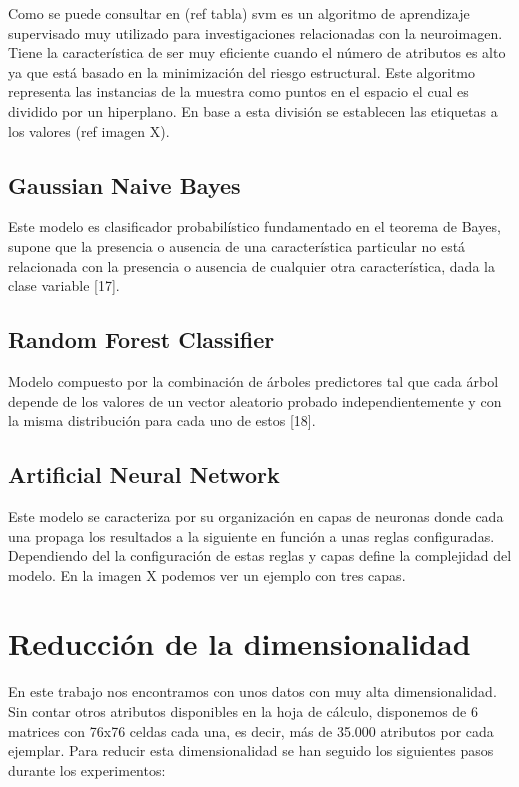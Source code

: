 Como se puede consultar en (ref tabla) \gls{svm} es un algoritmo de aprendizaje supervisado muy utilizado para investigaciones relacionadas con la neuroimagen. Tiene la característica de ser muy eficiente cuando el número de atributos es alto ya que está basado en la minimización del riesgo estructural. Este algoritmo representa las instancias de la muestra como puntos en el espacio el cual es dividido por un hiperplano. En base a esta división se establecen las etiquetas a los valores (ref imagen X).

\subsection{Gaussian Naive Bayes}

Este modelo es clasificador probabilístico fundamentado en el teorema de Bayes,  supone que la presencia o ausencia de una característica particular no está relacionada con la presencia o ausencia de cualquier otra característica, dada la clase variable [17]. 

\subsection{Random Forest Classifier}
Modelo compuesto por la combinación de árboles predictores tal que cada árbol depende de los valores de un vector aleatorio probado independientemente y con la misma distribución para cada uno de estos [18]. 

\subsection{Artificial Neural Network}
Este modelo se caracteriza por su organización en capas de neuronas donde cada una
propaga los resultados a la siguiente en función a unas reglas configuradas. Dependiendo del la configuración de estas reglas y capas define la complejidad del modelo. En la imagen X podemos ver un ejemplo con tres capas.

\section{Reducción de la dimensionalidad}

En este trabajo nos encontramos con unos datos con muy alta dimensionalidad. Sin contar otros atributos disponibles en la hoja de cálculo, disponemos de 6 matrices con 76x76 celdas cada una, es decir, más de 35.000 atributos por cada ejemplar. Para reducir esta dimensionalidad se han seguido los siguientes pasos durante los experimentos:


